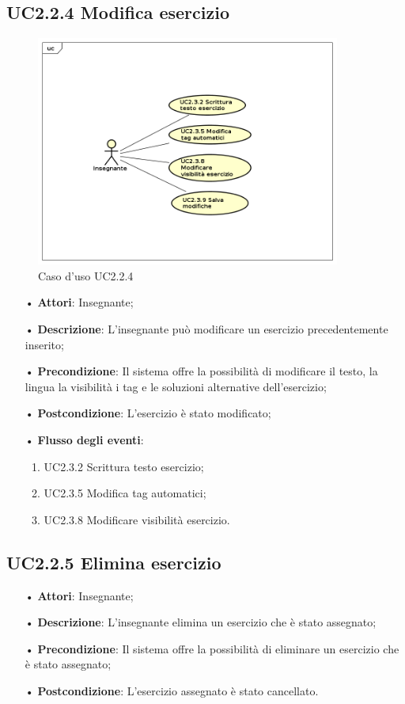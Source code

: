 \subsection{UC2.2.4 Modifica esercizio}

\begin{figure}[H]
\centering
\includegraphics[width=10cm]{img/UC224.png} 
\caption{Caso d'uso UC2.2.4}
\end{figure}

\begin{itemize}
	\item[•] \textbf{Attori}: Insegnante;
	\item[•] \textbf{Descrizione}: L’insegnante può modificare un esercizio precedentemente inserito;
	\item[•] \textbf{Precondizione}: Il sistema offre la possibilità di modificare il testo, la
				lingua la visibilità i tag e le soluzioni alternative 
				dell’esercizio;
	\item[•] \textbf{Postcondizione}: L’esercizio è stato modificato;
	\item[•] \textbf{Flusso degli eventi}:
		\begin{enumerate}
			\item UC2.3.2 Scrittura testo esercizio;
			\item UC2.3.5 Modifica tag automatici;
			\item UC2.3.8 Modificare visibilità esercizio.
		\end{enumerate}
		    
\end{itemize}   	
	
\subsection{UC2.2.5 Elimina esercizio}
\begin{itemize}
	\item[•] \textbf{Attori}: Insegnante;
	\item[•] \textbf{Descrizione}: L’insegnante elimina un esercizio che è stato assegnato;
	\item[•] \textbf{Precondizione}: Il sistema offre la possibilità di eliminare un esercizio che è stato assegnato;
	\item[•] \textbf{Postcondizione}: L’esercizio assegnato è stato cancellato.
\end{itemize}


